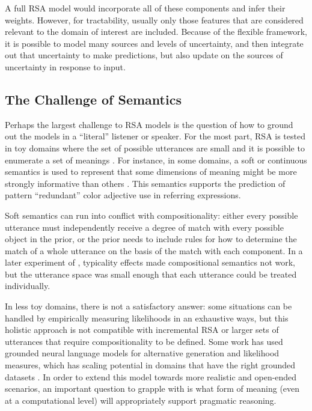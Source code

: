 \documentclass[]{article}
\begin{document}
A full RSA model would incorporate all of these components and infer their weights. However, for tractability, usually only those features that are considered relevant to the domain of interest are included. Because of the flexible framework, it is possible to model many sources and levels of uncertainty, and then integrate out that uncertainty to make predictions, but also update on the sources of uncertainty in response to input. 

\subsection{The Challenge of Semantics}
Perhaps the largest challenge to RSA models is the question of how to ground out the models in a ``literal'' listener or speaker. For the most part, RSA is tested in toy domains where the set of possible utterances are small and it is possible to enumerate a set of meanings \citep{frank2012a,goodman2013, bergen}. For instance, in some domains, a soft or continuous semantics is used to represent that some dimensions of meaning might be more strongly informative than others \cite{degen20200406}. This semantics supports the prediction of pattern ``redundant'' color adjective use in referring expressions. 

Soft semantics can run into conflict with compositionality: either every possible utterance must independently receive a degree of match with every possible object in the prior, or the prior needs to include rules for how to determine the match of a whole utterance on the basis of the match with each component. In a later experiment of \citep{degen20200406}, typicality effects made compositional semantics not work, but the utterance space was small enough that each utterance could be treated individually. 

 In less toy domains, there is not a satisfactory answer: some situations can be handled by empirically measuring likelihoods in an exhaustive ways, but this holistic approach is not compatible with incremental RSA \citep{cohn-gordon2018a} or larger sets of utterances that require compositionality to be defined. Some work has used grounded neural language models for alternative generation and likelihood measures, which has scaling potential in domains that have the right grounded datasets \citep{monroe2015, white2020, cohn-gordon2018}.  In order to extend this model towards more realistic and open-ended scenarios, an important question to grapple with is what form of meaning (even at a computational level) will appropriately support pragmatic reasoning. 
 
\end{document}

